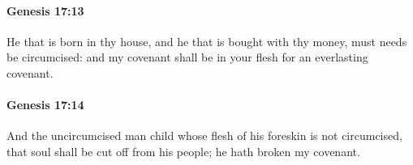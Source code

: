 		\paragraph{Genesis 17:13} %
			\label{GENESIS-17-13}

			He that is born in thy house, and he that is bought with thy money, must needs be circumcised: and my covenant shall be in your flesh for an everlasting covenant.


		\paragraph{Genesis 17:14} %
			\label{GENESIS-17-14}

			And the uncircumcised man child whose flesh of his foreskin is not circumcised, that soul shall be cut off from his people; he hath broken my covenant.


